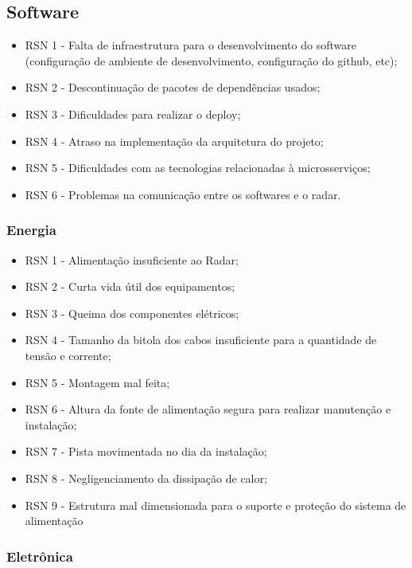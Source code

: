 \subsection{Software}
\begin{itemize}
    \item RSN 1 - Falta de infraestrutura para o desenvolvimento do software (configuração de ambiente de desenvolvimento, configuração do github, etc);
    \item RSN 2 - Descontinuação de pacotes de dependências usados;
    \item RSN 3 - Dificuldades para realizar o deploy;
    \item RSN 4 - Atraso na implementação da arquitetura do projeto;
    \item RSN 5 - Dificuldades com as tecnologias relacionadas à microsserviços;
    \item RSN 6 - Problemas na comunicação entre os softwares e o radar.
\end{itemize}

\subsubsection{Energia}
\begin{itemize}
   \item RSN 1 - Alimentação insuficiente ao Radar;
   \item RSN 2 - Curta vida útil dos equipamentos; 
   \item RSN 3 - Queima dos componentes elétricos;
   \item RSN 4 - Tamanho da bitola dos cabos insuficiente para a quantidade de tensão e corrente;
   \item RSN 5 - Montagem mal feita;
   \item RSN 6 - Altura da fonte de alimentação segura para realizar manutenção e instalação;
   \item RSN 7 - Pista movimentada no dia da instalação;
   \item RSN 8 - Negligenciamento da dissipação de calor;
   \item RSN 9 - Estrutura mal dimensionada para o suporte e proteção do sistema de alimentação
\end{itemize}

\subsubsection{Eletrônica}

